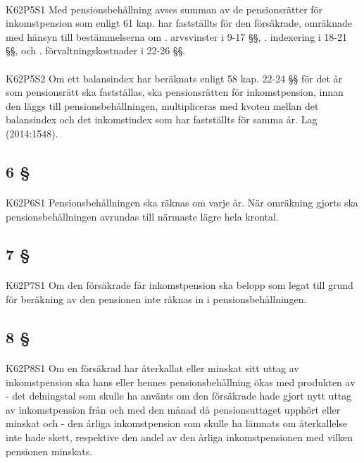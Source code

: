 \documentclass[a4paper,notitlepage,openany,10pt]{book}
\begin{document}
\paragraph*{}
{\tiny K62P5S1}
Med pensionsbehållning avses summan av de pensionsrätter för inkomstpension som enligt 61 kap. har fastställts för den försäkrade, omräknade med hänsyn till bestämmelserna om
. arvsvinster i 9-17 §§,
. indexering i 18-21 §§, och
. förvaltningskostnader i 22-26 §§.
\paragraph*{}
{\tiny K62P5S2}
Om ett balansindex har beräknats enligt 58 kap. 22-24 §§ för det år som pensionsrätt ska fastställas, ska pensionsrätten för inkomstpension, innan den läggs till pensionsbehållningen, multipliceras med kvoten mellan det balansindex och det inkomstindex som har fastställts för samma år.
Lag (2014:1548).
\subsection*{6 §}
\paragraph*{}
{\tiny K62P6S1}
Pensionsbehållningen ska räknas om varje år. När omräkning gjorts ska pensionsbehållningen avrundas till närmaste lägre hela krontal.
\subsection*{7 §}
\paragraph*{}
{\tiny K62P7S1}
Om den försäkrade får inkomstpension ska belopp som legat till grund för beräkning av den pensionen inte räknas in i pensionsbehållningen.
\subsection*{8 §}
\paragraph*{}
{\tiny K62P8S1}
Om en försäkrad har återkallat eller minskat sitt uttag av inkomstpension ska hans eller hennes pensionsbehållning ökas med produkten av
\newline - det delningstal som skulle ha använts om den försäkrade hade gjort nytt uttag av inkomstpension från och med den månad då pensionsuttaget upphört eller minskat och - den årliga inkomstpension som skulle ha lämnats om återkallelse inte hade skett, respektive den andel av den årliga inkomstpensionen med vilken pensionen minskats.
\end{document}
